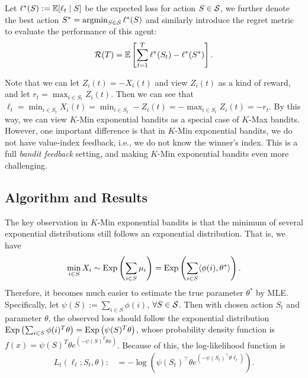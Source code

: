 Let $\ell^*(S) := \mathbb{E}[\ell_t \mid S]$ be the expected loss for action $S \in {\mathcal{S}}$, we further denote the best action $S^* = \operatorname*{argmin}_{S \in {\mathcal{S}}} \ell^*(S)$ and similarly introduce the regret metric to evaluate the performance of this agent:
\begin{align*}
    {\mathcal{R}}(T) = \mathbb{E}\left[\sum_{t=1}^T \ell^*(S_t) - \ell^*(S^*)\right].
\end{align*}

Note that we can let $Z_i(t)= - X_i(t)$ and view $Z_i(t)$ as a kind of reward, and let $r_t = \max_{i \in S_t} Z_i(t)$. Then we can see that $\ell_t = \min_{i \in S_t} X_i(t) = \min_{i \in S_t} -Z_i(t) = - \max_{i \in S_t} Z_i(t) = -r_t$. By this way, we can view $K$-Min exponential bandits as a special case of $K$-Max bandits. 
%
However, one important difference is that in $K$-Min exponential bandits, we do not have value-index feedback, i.e., we do not know the winner's index. This is a full \textit{bandit feedback} setting, and making $K$-Min exponential bandits even more challenging. 

\subsection{Algorithm and Results}

The key observation in $K$-Min exponential bandits is that the minimum of several exponential distributions still follows an exponential distribution. That is, we have 
\begin{align*}
    \min_{i \in S} X_i \sim \operatorname{Exp}\left(\sum_{i \in S} \mu_i\right) = \operatorname{Exp}\left(\sum_{i \in S} \langle \phi(i), \theta^*\rangle \right).
\end{align*}
Therefore, it becomes much easier to estimate the true parameter $\theta^*$ by MLE. 
%
Specifically, let $\psi(S)  := \sum_{i \in S} \phi(i)$, $\forall S \in {\mathcal{S}}$. Then with chosen action $S_t$ and parameter $\theta$, the observed loss should follow the exponential distribution $\operatorname{Exp}\left(\sum_{i \in S} \phi(i)^T \theta \right) = \operatorname{Exp}\left(\psi(S)^T\theta\right)$, whose probability density function is $f(x) = \psi(S)^T\theta  e^{\left(-\psi(S)^T\theta  x\right)}$. 
%
Because of this, the log-likelihood function is 
\begin{equation}
\begin{aligned}
    L_t(\ell_t; S_t, \theta) :&= - \log \left( \psi(S_t)^\top \theta e^{\left( -\psi(S_t)^\top \theta \ell_t\right)} \right).
\end{aligned}
\end{equation}

